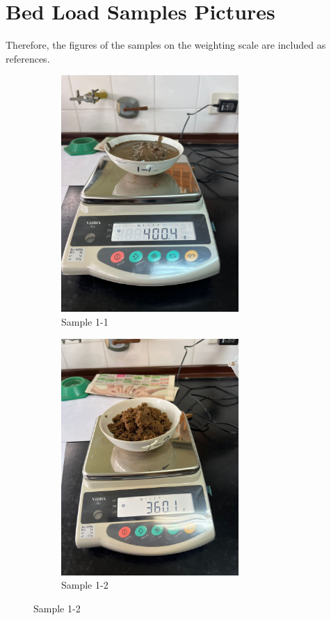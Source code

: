 \clearpage
\section{Bed Load Samples Pictures}
Therefore, the figures of the samples on the weighting scale are included as references.

\begin{figure}[H]
    \centering
    \begin{subfigure}[b]{0.48\textwidth}
        \includegraphics[width=\linewidth, height =9cm]{figures/appendix-f/1-1.jpg}
        \caption{Sample 1-1}
        \label{fig:second}
    \end{subfigure}
    \hfill
    \begin{subfigure}[b]{0.48\textwidth}
        \includegraphics[width=\linewidth, height =9cm]{figures/appendix-f/1-2.jpg}
        \caption{Sample 1-2}
        \label{fig:second}
    \end{subfigure}
    


\end{figure}

